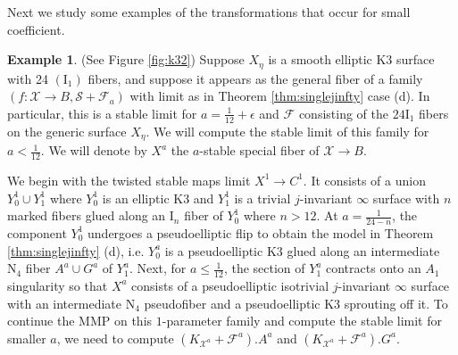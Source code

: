 \documentclass[11pt]{amsart}
\theoremstyle{definition}
\newtheorem{example}[theorem]{Example}
\theoremstyle{remark}
\begin{document}
	Next we study some examples of the transformations that occur for small coefficient.  
	
	\begin{example}\label{ex:1}(See Figure \ref{fig:k32})
		Suppose $X_{\eta}$ is a smooth elliptic K3 surface with 24 $(\mathrm{I}_1)$ fibers, and suppose it appears as the general fiber of a family $(f : \mathscr{X} \to B, \mathscr{S} + \mathscr{F}_a)$ with limit as in Theorem \ref{thm:singlejinfty} case (d). In particular, this is a stable limit for $a = \frac{1}{12} + \epsilon$ and $\mathscr{F}$ consisting of the $24\mathrm{I}_1$ fibers on the generic surface $X_\eta$. We will compute the stable limit of this family for $a < \frac{1}{12}$. We will denote by $X^{a}$ the $a$-stable special fiber of $\mathscr{X} \to B$. 
		
		We begin with the twisted stable maps limit $X^1\to C^1$. It consists of a union $Y_{0}^1 \cup Y_{1}^1$ where $Y_{0}^1$ is an elliptic K3 and $Y_{1}^1$ is a trivial $j$-invariant $\infty$ surface with $n$ marked fibers glued along an $\mathrm{I}_n$ fiber of $Y_{0}^1$ where $n > 12$. At $a = \frac{1}{24 - n}$, the component $Y_{0}^1$ undergoes a pseudoelliptic flip to obtain the model in Theorem \ref{thm:singlejinfty}  (d), i.e. $Y_0^a$ is a pseudoelliptic K3 glued along an intermediate $\mathrm{N}_4$ fiber $A^a \cup G^a$ of $Y_{1}^a$. Next, for $a \le \frac{1}{12}$, the section of $Y_1^a$ contracts onto an $A_1$ singularity so that $X^a$ consists of a pseudoelliptic isotrivial $j$-invariant $\infty$ surface with an intermediate $\mathrm{N}_4$ pseudofiber and a pseudoelliptic K3 sprouting off it. To continue the MMP on this $1$-parameter family and compute the stable limit for smaller $a$, we need to compute
		$
		(K_{\mathscr{X}^a} + \mathscr{F}^a).A^a$ and $(K_{\mathscr{X}^a} + \mathscr{F}^a).G^a.
		$
		

\end{example}
\end{document}
